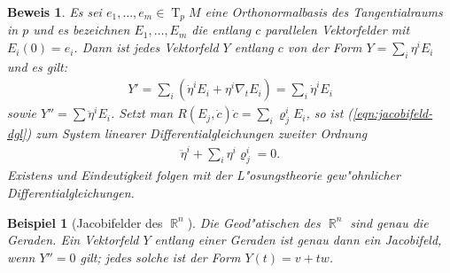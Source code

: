 \documentclass[paper=A4, twoside, chapterprefix=true, bibliography=totoc, headsepline]{scrbook}
\let\temp\phi
\let\phi\varphi
\let\varphi\temp
\let\temp\theta
\let\theta\vartheta
\let\vartheta\temp
\let\temp\epsilon
\let\epsilon\varepsilon
\let\varepsilon\temp
\let\temp\rho
\let\rho\varrho
\let\varrho\temp
\newcommand{\tikzgitter}[3][0.25]{ %
	\draw[step=#1,gray!15] #2 grid #3;
	\draw[step=2*#1,gray!30] #2 grid #3;
	\fill (0,0) circle(0.1); 
}
\DeclareMathOperator{\R}{\mathbb{R}}
\DeclareMathOperator{\T}{T} %
\theoremstyle{plain}
\theoremstyle{nonumberplain}
\newtheorem{bsp}{Beispiel}
\newtheorem{bew}{Beweis}
\theoremstyle{empty}
\theoremstyle{break}
\begin{document}
\begin{bew}
  Es sei $e_1, \ldots, e_m \in \T_pM$ eine Orthonormalbasis des Tangentialraums in $p$ und es bezeichnen $E_1, \ldots, E_m$ die entlang $c$ parallelen Vektorfelder mit $E_i(0) = e_i$.
  Dann ist jedes Vektorfeld $Y$ entlang $c$ von der Form $Y = \sum_i \eta^iE_i$ und es gilt:
  \begin{align*}
    Y' = \sum_i (\dot \eta^i E_i + \eta^i\nabla_tE_i) = \sum_i \dot
    \eta^i E_i
  \end{align*}
  sowie $Y'' = \sum \ddot \eta^i E_i$.
  Setzt man $R(E_j,\dot c)\dot c = \sum_i\rho_j^i E_i$, so ist (\ref{eqn:jacobifeld-dgl}) zum System linearer Differentialgleichungen zweiter Ordnung
  \begin{align*}
    \ddot \eta^i + \sum_i \eta^i\rho_j^i = 0.
  \end{align*}
  Existens und Eindeutigkeit folgen mit der L"osungstheorie gew"ohnlicher Differentialgleichungen.
\end{bew}

\begin{bsp}[Jacobifelder des $\R^n$]
  Die Geod"atischen des $\R^n$ sind genau die Geraden.
  Ein Vektorfeld $Y$ entlang einer Geraden ist genau dann ein Jacobifeld, wenn $Y'' = 0$ gilt; jedes solche ist der Form $Y(t) = v + tw$.
  \begin{center}\end{center}
\end{bsp}
\end{document}
